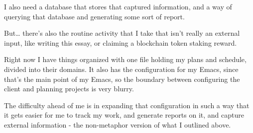 \documentclass[11pt]{article}
\begin{document}
\begin{itemize}
I also need a database that stores that captured information, and a way of querying that database and generating some sort of report.

But\ldots{} there's also the routine activity that I take that isn't really an external input, like writing this essay, or claiming a blockchain token staking reward.

Right now I have things organized with one file holding my plans and schedule, divided into their domains. It also has the configuration for my Emacs, since that's the main point of my Emacs, so the boundary between configuring the client and planning projects is very blurry.

The difficulty ahead of me is in expanding that configuration in such a way that it gets easier for me to track my work, and generate reports on it, and capture external information - the non-metaphor version of what I outlined above.
\end{itemize}
\stopcontents[level-4]
\end{document}
